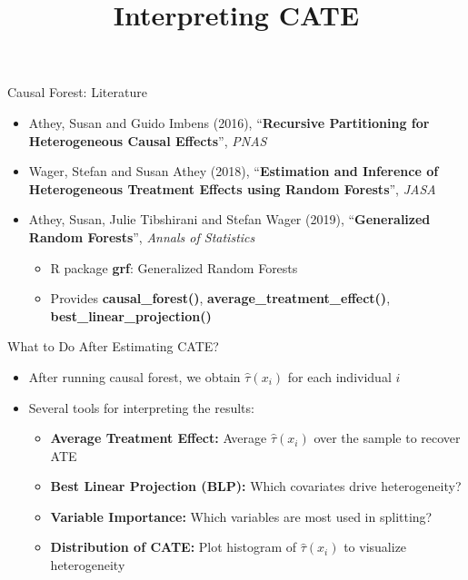\documentclass[hyperref={pdfpagelabels=false}]{beamer}
\begin{document}
\begin{frame}{Causal Forest: Literature}
	\begin{itemize}
		\item[] Athey, Susan and Guido Imbens (2016), ``\textbf{Recursive Partitioning for Heterogeneous Causal Effects}'', \textit{PNAS}
		\vspace{0.2cm}
		\item[] Wager, Stefan and Susan Athey (2018), ``\textbf{Estimation and Inference of Heterogeneous Treatment Effects using Random Forests}'', \textit{JASA}
		\vspace{0.2cm}
		\item[] Athey, Susan, Julie Tibshirani and Stefan Wager (2019), ``\textbf{Generalized Random Forests}'', \textit{Annals of Statistics}
		\vspace{0.2cm}
		\begin{itemize}
			\item R package \textbf{grf}: Generalized Random Forests
			\vspace{0.2cm}
			\item Provides \textbf{causal\_forest()}, \textbf{average\_treatment\_effect()}, \textbf{best\_linear\_projection()}
		\end{itemize}
	\end{itemize}
\end{frame}




\title[]
{Interpreting CATE}

\author{}
\institute{}
\date{}

\begin{frame}{}
	\titlepage
\end{frame}




\begin{frame}{What to Do After Estimating CATE?}
	\begin{itemize}
		\item After running causal forest, we obtain $\hat{\tau}(x_i)$ for each individual $i$
		\vspace{0.3cm}
		\item Several tools for interpreting the results:
		\vspace{0.2cm}
		\begin{itemize}
			\item[1] \textbf{Average Treatment Effect:} Average $\hat{\tau}(x_i)$ over the sample to recover ATE
			\vspace{0.2cm}
			\item[2] \textbf{Best Linear Projection (BLP):} Which covariates drive heterogeneity?
			\vspace{0.2cm}
			\item[3] \textbf{Variable Importance:} Which variables are most used in splitting?
			\vspace{0.2cm}
			\item[4] \textbf{Distribution of CATE:} Plot histogram of $\hat{\tau}(x_i)$ to visualize heterogeneity
		\end{itemize}
	\end{itemize}
\end{frame}
\end{document}
